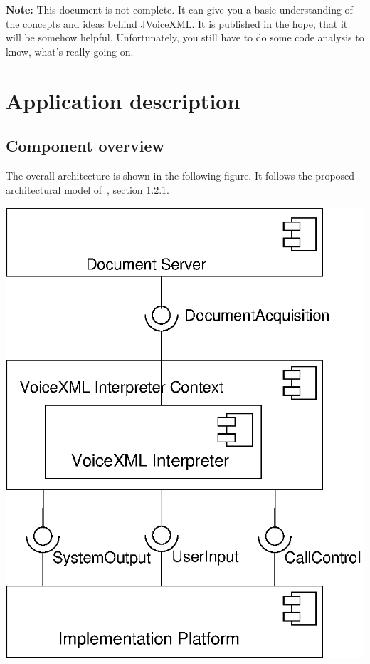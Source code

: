 \documentclass[11pt,a4paper]{article}
\begin{document}
\textbf{Note: } This document is not complete. It can give you a basic
understanding of the concepts and ideas behind JVoiceXML. It is
published in the hope, that it will be somehow helpful.
Unfortunately, you still have to do some code analysis to know, what's
really going on.

\section{Application description}
\label{sec:appl-descr}

\subsection{Component overview}
\label{sec:component-overview}

The overall architecture is shown in the following figure.
It follows the proposed architectural model of~\cite{w3.org:voicexml}, 
section 1.2.1. 

\begin{center}
\includegraphics{overview.eps}
\end{center}
\end{document}
